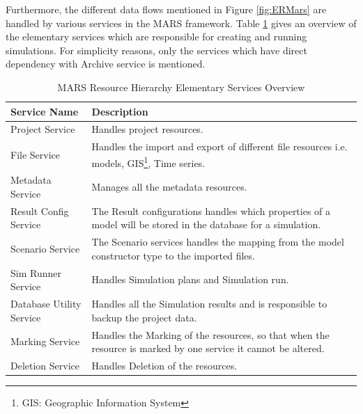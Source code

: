         \newpage
        Furthermore, the different data flows mentioned in Figure \ref{fig:ERMars} are handled by various services in the MARS framework. 
        Table \ref{table:MARS Resource Hierarchy Service Overview} gives an overview of the elementary services which are responsible for 
        creating and running simulations. For simplicity reasons, only the services
        which have direct dependency with Archive service is mentioned.
        \begin{table}[h!]
            \centering
            \begin{tabular}{|p{4cm}|p{10.5cm}|}
                \hline
                    \textbf{Service Name}  & \textbf{Description}\\
                \hline
                    Project Service & 
                    Handles project resources. \\
                \hline
                    File Service
                    & Handles the import and export of different file resources i.e. models, GIS\footnote{\label{footnote:GIS}GIS: Geographic Information System}, 
                    Time series.\\
                \hline
                    Metadata Service  & Manages all the metadata resources.\\
                \hline
                    Result Config Service  & The Result configurations handles which properties of a model will be stored in the database for a simulation.\\
                \hline
                    Scenario Service  & The Scenario services handles the mapping from the model constructor type to the imported files.\\
                \hline
                    Sim Runner Service  & Handles Simulation plans and Simulation run.\\
                \hline
                    Database Utility Service  & Handles all the Simulation results and is responsible to backup the project data.\\
                \hline
                    Marking Service  & Handles the Marking of the resources, so that when the resource is marked by one service it cannot be altered.\\
                \hline
                    Deletion Service  & Handles Deletion of the resources.\\
                \hline
            \end{tabular}
            \caption{MARS Resource Hierarchy Elementary Services Overview}
            \label{table:MARS Resource Hierarchy Service Overview}     
        \end{table}    